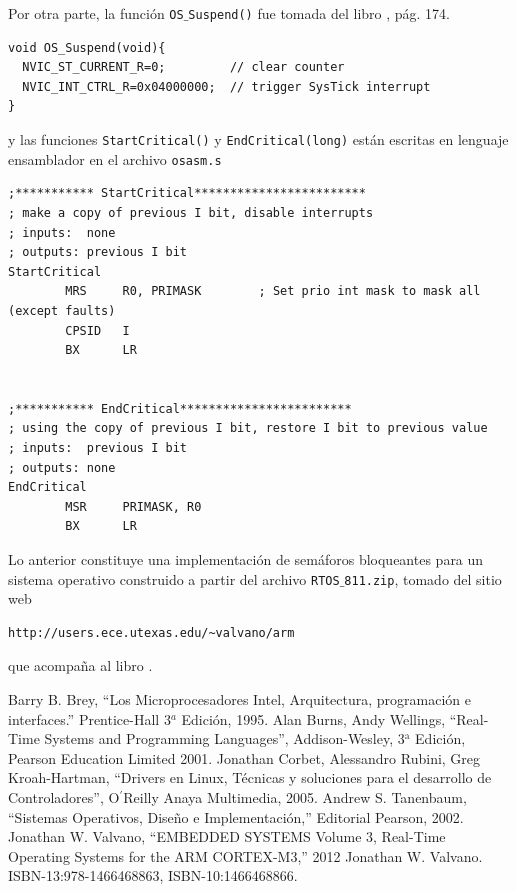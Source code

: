 \documentclass{article}
\begin{document}
Por otra parte, la funci\'on {\tt OS}$\_${\tt Suspend()} fue tomada 
del libro \cite{Valvano}, p\'ag. 174.
\begin{verbatim}
void OS_Suspend(void){
  NVIC_ST_CURRENT_R=0;         // clear counter
  NVIC_INT_CTRL_R=0x04000000;  // trigger SysTick interrupt
}
\end{verbatim}
y las funciones {\tt StartCritical()} y {\tt EndCritical(long)} est\'an 
escritas en lenguaje ensamblador en el archivo {\tt osasm.s}
\begin{verbatim}
;*********** StartCritical************************
; make a copy of previous I bit, disable interrupts
; inputs:  none
; outputs: previous I bit
StartCritical
        MRS     R0, PRIMASK        ; Set prio int mask to mask all (except faults)
        CPSID   I
        BX      LR


;*********** EndCritical************************
; using the copy of previous I bit, restore I bit to previous value
; inputs:  previous I bit
; outputs: none
EndCritical
        MSR     PRIMASK, R0
        BX      LR
\end{verbatim}
Lo anterior constituye una implementaci\'on de sem\'aforos bloqueantes para un  
sistema operativo construido a partir del archivo {\tt RTOS$\_$811.zip}, tomado del 
sitio web 
\begin{verbatim}
http://users.ece.utexas.edu/~valvano/arm
\end{verbatim}
que acompa\~na al libro \cite{Valvano}.

\eject
\begin{thebibliography}{9}
Barry B. Brey, ``Los Microprocesadores Intel, 
Arquitectura, programaci\'on e interfaces.'' Prentice-Hall 
3$^{a}$ Edici\'on, 1995.
Alan Burns, Andy Wellings, ``Real-Time Systems and 
Programming Languages'', Addison-Wesley, 3$^{\mbox{a}}$ Edici\'on, 
Pearson Education Limited 2001.
Jonathan Corbet, Alessandro Rubini, Greg Kroah-Hartman, 
``Drivers en Linux, T\'ecnicas y soluciones para el desarrollo de 
Controladores'', O$^{\prime}$Reilly Anaya Multimedia, 2005.
Andrew S. Tanenbaum, ``Sistemas Operativos, 
Dise\~no e Implementaci\'on,'' Editorial Pearson, 2002.
Jonathan W. Valvano, ``EMBEDDED SYSTEMS Volume 3, Real-Time Operating 
Systems for the ARM CORTEX-M3,'' 2012 Jonathan W. Valvano. ISBN-13:978-1466468863, 
ISBN-10:1466468866. 
\end{thebibliography}
\end{document}

